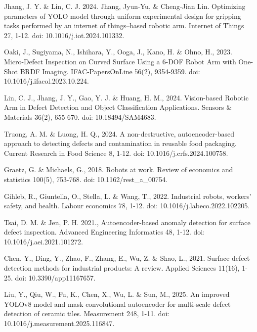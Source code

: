 
\begin{thebibliography}{9}

  Jhang, J. Y. \& Lin, C. J. 2024. Jhang, Jyun-Yu, \& Cheng-Jian
  Lin. Optimizing parameters of YOLO model through uniform
  experimental design for gripping tasks performed by an internet of
  things–based robotic arm. Internet of Things 27, 1-12. doi:
  10.1016/j.iot.2024.101332.

  Oaki, J., Sugiyama, N., Ishihara, Y., Ooga, J., Kano, H. \& Ohno,
  H., 2023. Micro-Defect Inspection on Curved Surface Using a 6-DOF
  Robot Arm with One-Shot BRDF Imaging. IFAC-PapersOnLine 56(2),
  9354-9359. doi: 10.1016/j.ifacol.2023.10.224.

  Lin, C. J., Jhang, J. Y., Gao, Y. J. \& Huang, H. M., 2024.
  Vision-based Robotic Arm in Defect Detection and Object
  Classification Applications. Sensors \& Materials 36(2), 655-670.
  doi: 10.18494/SAM4683.

  Truong, A. M. \& Luong, H. Q., 2024. A non-destructive,
  autoencoder-based approach to detecting defects and contamination
  in reusable food packaging. Current Research in Food Science 8, 1-12.
  doi: 10.1016/j.crfs.2024.100758.

  Graetz, G. \& Michaels, G., 2018. Robots at work. Review of
  economics and statistics 100(5), 753-768. doi: 10.1162/rest\_a\_00754.

  Gihleb, R., Giuntella, O., Stella, L. \& Wang, T., 2022.
  Industrial robots, workers’ safety, and health. Labour economics
  78, 1-12. doi: 10.1016/j.labeco.2022.102205.

  Tsai, D. M. \& Jen, P. H. 2021., Autoencoder-based anomaly detection
  for surface defect inspection. Advanced Engineering Informatics 48,
  1-12. doi: 10.1016/j.aei.2021.101272.

  Chen, Y., Ding, Y., Zhao, F., Zhang, E., Wu, Z. \& Shao, L., 2021.
  Surface defect detection methods for industrial products: A review.
  Applied Sciences 11(16), 1-25. doi: 10.3390/app11167657.

  Liu, Y., Qiu, W., Fu, K., Chen, X., Wu, L. \& Sun, M., 2025. An
  improved YOLOv8 model and mask convolutional autoencoder for
  multi-scale defect detection of ceramic tiles. Measurement 248,
  1-11. doi: 10.1016/j.measurement.2025.116847.


\end{thebibliography}
